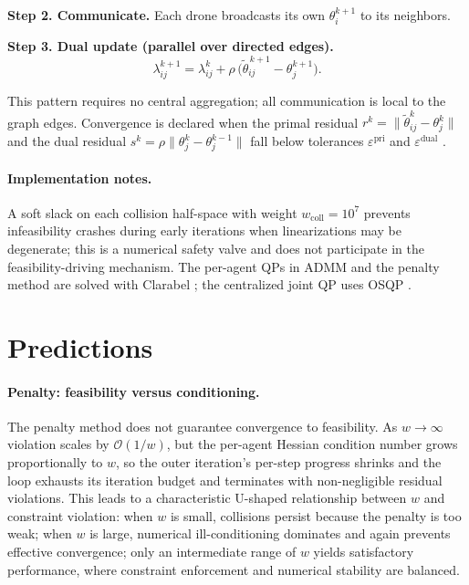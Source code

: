 \documentclass[11pt,onecolumn]{article}
\begin{document}
\textbf{Step 2. Communicate.}  Each drone broadcasts its own $\theta_i^{k+1}$ to its
neighbors.

\textbf{Step 3. Dual update (parallel over directed edges).}
\begin{equation}
  \lambda_{ij}^{k+1} = \lambda_{ij}^k + \rho\, \bigl(\tilde\theta_{ij}^{\,k+1} - \theta_j^{k+1}\bigr).
  \label{eq:admm_dual}
\end{equation}

This pattern requires no central aggregation; all communication is local to the graph
edges.  Convergence is declared when the primal residual
$r^k = \|\tilde\theta_{ij}^{k} - \theta_j^k\|$ and the dual residual
$s^k = \rho\|\theta_j^k - \theta_j^{k-1}\|$ fall below tolerances
$\varepsilon^{\mathrm{pri}}$ and $\varepsilon^{\mathrm{dual}}$ \cite{boyd2011admm}.

\paragraph{Implementation notes.}
A soft slack on each collision half-space with weight $w_{\mathrm{coll}} = 10^7$
prevents infeasibility crashes during early iterations when linearizations may be
degenerate; this is a numerical safety valve and does not participate in the
feasibility-driving mechanism.  The per-agent QPs in ADMM and the penalty method are
solved with Clarabel \cite{goulart2024clarabel}; the centralized joint QP uses OSQP
\cite{stellato2020osqp}.

\section{Predictions}
\label{sec:theory}

\paragraph{Penalty: feasibility versus conditioning.}
The penalty method does not guarantee convergence to feasibility.  As $w \to \infty$
violation scales by $\mathcal{O}(1/w)$, but the per-agent Hessian condition number
grows proportionally to $w$, so the outer iteration's per-step progress shrinks and
the loop exhausts its iteration budget and terminates with non-negligible residual violations.
This leads to a characteristic U-shaped relationship between $w$ and constraint violation: when $w$ is small, collisions persist because the penalty is too weak; when $w$ is large, numerical ill-conditioning dominates and again prevents effective convergence; only an intermediate range of $w$ yields satisfactory performance, where constraint enforcement and numerical stability are balanced.
\end{document}
